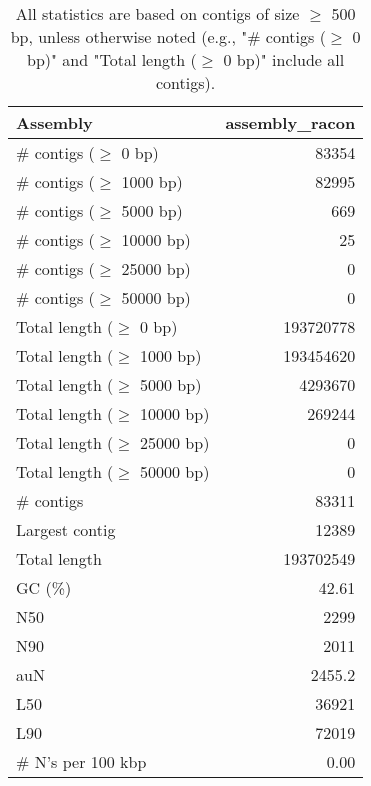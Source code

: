 \documentclass[12pt,a4paper]{article}
\begin{document}
\begin{table}[ht]
\begin{center}
\caption{All statistics are based on contigs of size $\geq$ 500 bp, unless otherwise noted (e.g., "\# contigs ($\geq$ 0 bp)" and "Total length ($\geq$ 0 bp)" include all contigs).}
\begin{tabular}{|l*{1}{|r}|}
\hline
Assembly & assembly\_racon \\ \hline
\# contigs ($\geq$ 0 bp) & 83354 \\ \hline
\# contigs ($\geq$ 1000 bp) & 82995 \\ \hline
\# contigs ($\geq$ 5000 bp) & 669 \\ \hline
\# contigs ($\geq$ 10000 bp) & 25 \\ \hline
\# contigs ($\geq$ 25000 bp) & 0 \\ \hline
\# contigs ($\geq$ 50000 bp) & 0 \\ \hline
Total length ($\geq$ 0 bp) & 193720778 \\ \hline
Total length ($\geq$ 1000 bp) & 193454620 \\ \hline
Total length ($\geq$ 5000 bp) & 4293670 \\ \hline
Total length ($\geq$ 10000 bp) & 269244 \\ \hline
Total length ($\geq$ 25000 bp) & 0 \\ \hline
Total length ($\geq$ 50000 bp) & 0 \\ \hline
\# contigs & 83311 \\ \hline
Largest contig & 12389 \\ \hline
Total length & 193702549 \\ \hline
GC (\%) & 42.61 \\ \hline
N50 & 2299 \\ \hline
N90 & 2011 \\ \hline
auN & 2455.2 \\ \hline
L50 & 36921 \\ \hline
L90 & 72019 \\ \hline
\# N's per 100 kbp & 0.00 \\ \hline
\end{tabular}
\end{center}
\end{table}
\end{document}
